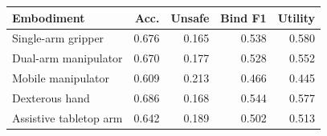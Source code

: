 \begin{tabular}{lrrrr}
\toprule
Embodiment & Acc. & Unsafe & Bind F1 & Utility \\
\midrule
Single-arm gripper & 0.676 & 0.165 & 0.538 & 0.580 \\
Dual-arm manipulator & 0.670 & 0.177 & 0.528 & 0.552 \\
Mobile manipulator & 0.609 & 0.213 & 0.466 & 0.445 \\
Dexterous hand & 0.686 & 0.168 & 0.544 & 0.577 \\
Assistive tabletop arm & 0.642 & 0.189 & 0.502 & 0.513 \\
\bottomrule
\end{tabular}
